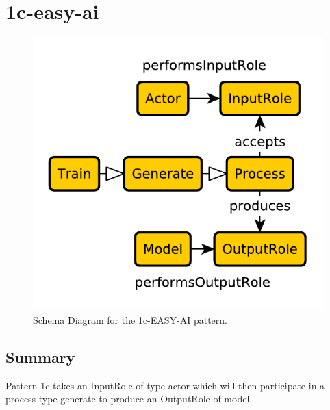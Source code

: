 \section{1c-easy-ai}
\label{sec:1c}
\begin{figure}[h!]
\begin{center}
\includegraphics[width=.8\textwidth]{images/schema-diagrams/1c-elementary-pattern.pdf}
\end{center}
\caption{Schema Diagram for the 1c-EASY-AI pattern. %
}
\label{fig:nen-accepts}
\end{figure}
\subsection{Summary}
Pattern 1c takes an InputRole of type-actor which will then participate in a process-type generate to produce an OutputRole of model. 
\label{sum:1c}
